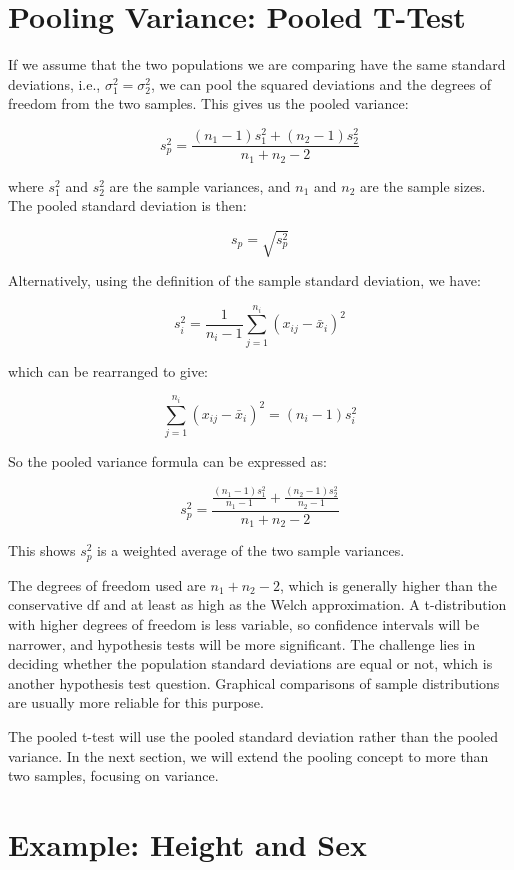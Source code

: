 \documentclass{article}
\begin{document}
\section*{Pooling Variance: Pooled T-Test}

If we assume that the two populations we are comparing have the same standard deviations, i.e., \(\sigma_1^2 = \sigma_2^2\), we can pool the squared deviations and the degrees of freedom from the two samples. This gives us the pooled variance:

\[
s_p^2 = \frac{(n_1 - 1)s_1^2 + (n_2 - 1)s_2^2}{n_1 + n_2 - 2}
\]

where \(s_1^2\) and \(s_2^2\) are the sample variances, and \(n_1\) and \(n_2\) are the sample sizes. The pooled standard deviation is then:

\[
s_p = \sqrt{s_p^2}
\]

Alternatively, using the definition of the sample standard deviation, we have:

\[
s_i^2 = \frac{1}{n_i - 1} \sum_{j=1}^{n_i} (x_{ij} - \bar{x}_i)^2
\]

which can be rearranged to give:

\[
\sum_{j=1}^{n_i} (x_{ij} - \bar{x}_i)^2 = (n_i - 1) s_i^2
\]

So the pooled variance formula can be expressed as:

\[
s_p^2 = \frac{\frac{(n_1 - 1)s_1^2}{n_1 - 1} + \frac{(n_2 - 1)s_2^2}{n_2 - 1}}{n_1 + n_2 - 2}
\]

This shows \(s_p^2\) is a weighted average of the two sample variances.

The degrees of freedom used are \(n_1 + n_2 - 2\), which is generally higher than the conservative \( \text{df} \) and at least as high as the Welch approximation. A t-distribution with higher degrees of freedom is less variable, so confidence intervals will be narrower, and hypothesis tests will be more significant. The challenge lies in deciding whether the population standard deviations are equal or not, which is another hypothesis test question. Graphical comparisons of sample distributions are usually more reliable for this purpose.

The pooled t-test will use the pooled standard deviation rather than the pooled variance. In the next section, we will extend the pooling concept to more than two samples, focusing on variance.

\section*{Example: Height and Sex}
\end{document}
